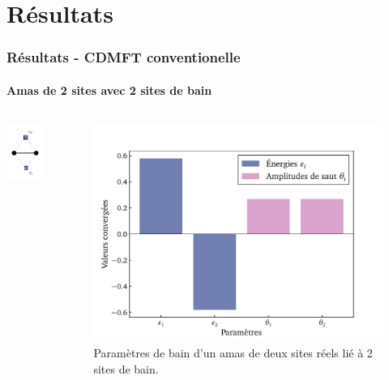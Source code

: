 
\section{Résultats}

\begin{frame}
    \begin{center}
    \vspace{0.5cm}
    \end{center}
\end{frame}

\begin{frame}
    \frametitle{Résultats - CDMFT conventionelle}
    \framesubtitle{Amas de 2 sites avec 2 sites de bain}
    \begin{columns}
        \centering
        \includegraphics[scale=1.25]{figures/results/clusters/1D_2s_2b_cluster.pdf}
        \begin{figure}
            \includegraphics[scale=0.45]{figures/results/graphs/1D_2s_2b.pdf}
            \caption{Paramètres de bain d'un amas de deux sites réels lié à 2 sites de bain.}
            \label{fig: simu_2s_2b}
        \end{figure}
    \end{columns}
\end{frame}

